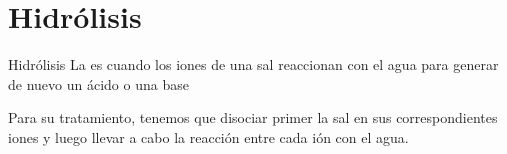 %
%
%
%
%
%


    \section{Hidrólisis}\label{sec:hidrolisis}

    \begin{center}
        \begin{definicion}[width=0.9\textwidth]{Hidrólisis}
            La  es cuando los iones de una sal reaccionan con el agua para generar de nuevo un ácido o una base
        \end{definicion}
    \end{center}


    Para su tratamiento, tenemos que disociar primer la sal en sus correspondientes iones y luego llevar a cabo la reacción entre cada ión con el agua.

